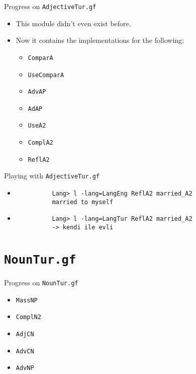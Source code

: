 \documentclass{beamer}
\begin{document}
  \begin{frame}{Progress on \texttt{AdjectiveTur.gf}}
    \begin{itemize}
      \item<1-> This module didn't even exist before.
      \item<2-> Now it contains the implementations for the following:
        \begin{itemize}
          \item \texttt{ComparA}
          \item \texttt{UseComparA}
          \item \texttt{AdvAP}
          \item \texttt{AdAP}
          \item \texttt{UseA2}
          \item \texttt{ComplA2}
          \item \texttt{ReflA2}
        \end{itemize}
    \end{itemize}
  \end{frame}

  \begin{frame}[fragile]{Playing with \texttt{AdjectiveTur.gf}}
    \begin{itemize}
      \item<1->
        \begin{lstlisting}
          Lang> l -lang=LangEng ReflA2 married_A2
          married to myself
        \end{lstlisting}
      \item<2->
        \begin{lstlisting}
          Lang> l -lang=LangTur ReflA2 married_A2
          -> kendi ile evli
        \end{lstlisting}
    \end{itemize}
  \end{frame}

  \section{\texttt{NounTur.gf}}

  \begin{frame}{Progress on \texttt{NounTur.gf}}
    \begin{itemize}
      \item \texttt{MassNP}
      \item \texttt{ComplN2}
      \item \texttt{AdjCN}
      \item \texttt{AdvCN}
      \item \texttt{AdvNP}
    \end{itemize}
  \end{frame}
\end{document}
